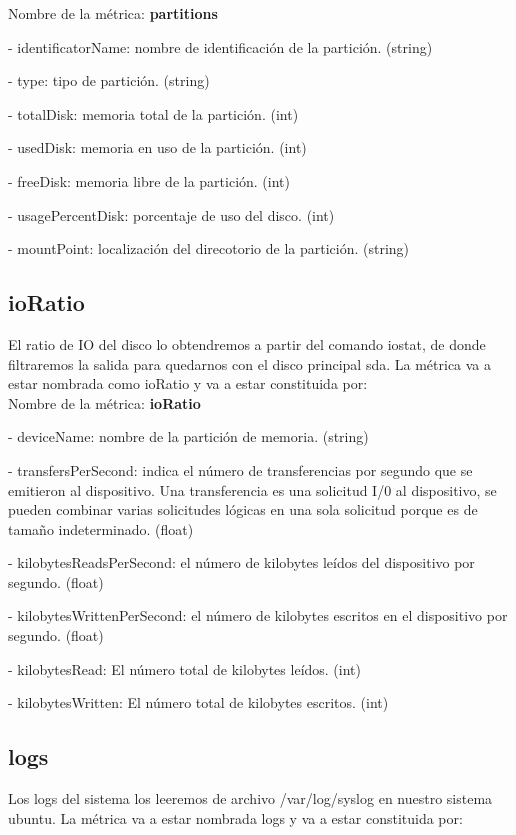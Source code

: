 \documentclass[ spanish, a4paper, 12pt, oneside]{report}
\begin{document}
Nombre de la métrica: \textbf{partitions}
  
\hyp{} identificatorName: nombre de identificación de la partición. (string)

\hyp{} type: tipo de partición. (string)
  
\hyp{} totalDisk: memoria total de la partición. (int)
  
\hyp{} usedDisk: memoria en uso de la partición. (int)
  
\hyp{} freeDisk: memoria libre de la partición. (int)
  
\hyp{} usagePercentDisk: porcentaje de uso del disco. (int)
   
\hyp{} mountPoint: localización del direcotorio de la partición. (string)

\subsection{ioRatio}
El ratio de IO del disco lo obtendremos a partir del comando iostat, de donde filtraremos la salida para quedarnos con el disco principal sda.
La métrica va a estar nombrada como ioRatio y va a estar constituida por:\\
 
Nombre de la métrica: \textbf{ioRatio}

\hyp{} deviceName: nombre de la partición de memoria. (string)

\hyp{} transfersPerSecond: indica el número de transferencias por segundo que se emitieron al dispositivo. 
Una transferencia es una solicitud I/0 al dispositivo, se pueden combinar varias solicitudes lógicas en una sola solicitud 
porque es de tamaño indeterminado. (float)

\hyp{} kilobytesReadsPerSecond: el número de kilobytes leídos del dispositivo por segundo. (float)

\hyp{} kilobytesWrittenPerSecond: el número de kilobytes escritos en el dispositivo por segundo. (float)

\hyp{} kilobytesRead: El número total de kilobytes leídos. (int)

\hyp{} kilobytesWritten: El número total de kilobytes escritos. (int)

\subsection{logs}
Los logs del sistema los leeremos de archivo /var/log/syslog en nuestro sistema ubuntu.
La métrica va a estar nombrada logs y va a estar constituida por:\\
\end{document}
